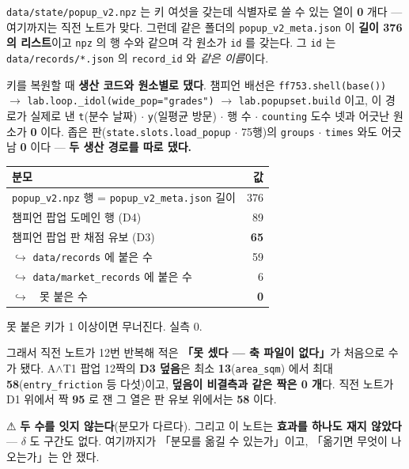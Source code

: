 \documentclass{article}
\begin{document}
\texttt{data/state/popup\_v2.npz} 는 키 여섯을 갖는데 식별자로 쓸 수 있는 열이
\textbf{0} 개다 --- 여기까지는 직전 노트가 맞다. 그런데 같은 폴더의
\texttt{popup\_v2\_meta.json} 이 \textbf{길이 376 의 리스트}이고
\texttt{npz} 의 행 수와 같으며 각 원소가 \texttt{id} 를 갖는다.
그 \texttt{id} 는 \texttt{data/records/*.json} 의 \texttt{record\_id} 와 \emph{같은 이름}이다.

키를 복원할 때 \textbf{생산 코드와 원소별로 댔다}. 챔피언 배선은
\texttt{ff753.shell(base())} $\to$ \texttt{lab.loop.\_idol(wide\_pop="grades")} $\to$
\texttt{lab.popupset.build} 이고, 이 경로가 실제로 낸 \texttt{t}(분수 날짜) $\cdot$
\texttt{y}(일평균 방문) $\cdot$ 행 수 $\cdot$ \texttt{counting} 도수 넷과
어긋난 원소가 \textbf{0} 이다. 좁은 판(\texttt{state.slots.load\_popup} $\cdot$ 75행)의
\texttt{groups} $\cdot$ \texttt{times} 와도 어긋남 \textbf{0} 이다 --- \textbf{두 생산 경로를 따로 댔다.}

\begin{center}
\begin{tabular}{lr}
\toprule
분모 & 값 \\
\midrule
\texttt{popup\_v2.npz} 행 = \texttt{popup\_v2\_meta.json} 길이 & 376 \\
챔피언 팝업 도메인 행 (D4) & 89 \\
챔피언 팝업 판 채점 유보 (D3) & \textbf{65} \\
\quad $\hookrightarrow$ \texttt{data/records} 에 붙은 수 & 59 \\
\quad $\hookrightarrow$ \texttt{data/market\_records} 에 붙은 수 & 6 \\
\quad $\hookrightarrow$ 🔴 못 붙은 수 & \textbf{0} \\
\bottomrule
\end{tabular}
\end{center}

{못 붙은 키가 1 이상이면 무너진다. 실측 0.}

그래서 직전 노트가 12번 반복해 적은 \textbf{「못 셌다 --- 축 파일이 없다」}가
처음으로 수가 됐다. A$\wedge$T1 팝업 12짝의 \textbf{D3 덮음}은
최소 \textbf{13}(\texttt{area\_sqm}) 에서 최대 \textbf{58}(\texttt{entry\_friction} 등 다섯)이고,
\textbf{덮음이 비결측과 같은 짝은 0 개}다.
직전 노트가 D1 위에서 짝 \textbf{95} 로 잰 그 열은 판 유보 위에서는 \textbf{58} 이다.

⚠ \textbf{두 수를 잇지 않는다}(분모가 다르다). 그리고 이 노트는
\textbf{효과를 하나도 재지 않았다} --- $\delta$ 도 구간도 없다.
여기까지가 「분모를 옮길 수 있는가」이고, 「옮기면 무엇이 나오는가」는 안 쟀다.
\end{document}
